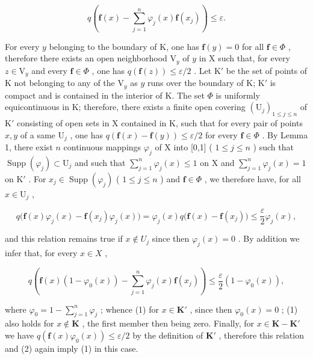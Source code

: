 \[
q \left(\mathbf {f} (x) - \sum_ {j = 1} ^ {n} \varphi_ {j} (x) \mathbf {f} \left(x _ {j}\right)\right) \leqslant \varepsilon .\tag{1}
\]

For every \(y\) belonging to the boundary of K, one has \(\mathbf{f}(y) = 0\) for all \(\mathbf{f} \in \Phi\) , therefore there exists an open neighborhood \(\mathrm{V}_y\) of \(y\) in X such that, for every \(z \in \mathrm{V}_y\) and every \(\mathbf{f} \in \Phi\) , one has \(q(\mathbf{f}(z)) \leqslant \varepsilon / 2\) . Let \(\mathrm{K}'\) be the set of points of K not belonging to any of the \(\mathrm{V}_y\) as \(y\) runs over the boundary of K; \(\mathrm{K}'\) is compact and is contained in the interior of K. The set \(\Phi\) is uniformly equicontinuous in K; therefore, there exists a finite open covering \((\mathrm{U}_j)_{1 \leqslant j \leqslant n}\) of \(\mathrm{K}'\) consisting of open sets in X contained in K, such that for every pair of points \(x, y\) of a same \(\mathrm{U}_j\) , one has \(q(\mathbf{f}(x) - \mathbf{f}(y)) \leqslant \varepsilon / 2\) for every \(\mathbf{f} \in \Phi\) . By Lemma 1, there exist \(n\) continuous mappings \(\varphi_j\) of X into {[}0,1{]} ( \(1 \leqslant j \leqslant n\) ) such that \(\operatorname{Supp}(\varphi_j) \subset \mathrm{U}_j\) and such that \(\sum_{j=1}^{n} \varphi_j(x) \leqslant 1\) on X and \(\sum_{j=1}^{n} \varphi_j(x) = 1\) on \(\mathrm{K}'\) . For \(x_j \in \operatorname{Supp}(\varphi_j)\) ( \(1 \leqslant j \leqslant n\) ) and \(\mathbf{f} \in \Phi\) , we therefore have, for all \(x \in \mathrm{U}_j\) ,

\[
q \big (\mathbf {f} (x) \varphi_ {j} (x) - \mathbf {f} (x _ {j}) \varphi_ {j} (x) \big) = \varphi_ {j} (x) q \big (\mathbf {f} (x) - \mathbf {f} (x _ {j}) \big) \leqslant \frac {\varepsilon}{2} \varphi_ {j} (x),
\]

and this relation remains true if \(x \notin U_{j}\) since then \(\varphi_{j}(x) = 0\) . By addition we infer that, for every \(x \in X\) ,

\[
q \left(\mathbf {f} (x) \left(1 - \varphi_ {0} (x)\right) - \sum_ {j = 1} ^ {n} \varphi_ {j} (x) \mathbf {f} \left(x _ {j}\right)\right) \leqslant \frac {\varepsilon}{2} \left(1 - \varphi_ {0} (x)\right),\tag{2}
\]

where \(\varphi_0 = 1 - \sum_{j=1}^{n} \varphi_j\) ; whence (1) for \(x \in \mathbf{K}'\) , since then \(\varphi_0(x) = 0\) ; (1) also holds for \(x \notin \mathbf{K}\) , the first member then being zero. Finally, for \(x \in \mathbf{K} - \mathbf{K}'\) we have \(q(\mathbf{f}(x)\varphi_0(x)) \leqslant \varepsilon/2\) by the definition of \(\mathbf{K}'\) , therefore this relation and (2) again imply (1) in this case.

